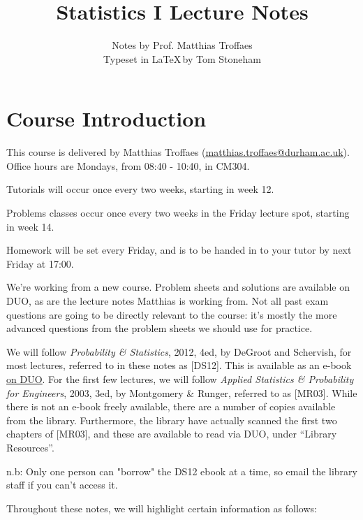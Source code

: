 \documentclass[a4paper]{article}
\title{\vspace{-2cm}Statistics I Lecture Notes}
\author{Notes by Prof. Matthias Troffaes \\ Typeset in \LaTeX \,by Tom Stoneham}
\date{}
\begin{document}
    \maketitle

    \tableofcontents

    \newpage
    \section*{Course Introduction}
        This course is delivered by Matthias Troffaes
        (\href{mailto:matthias.troffaes@durham.ac.uk}
        {\underline{matthias.troffaes@durham.ac.uk}}). Office hours are Mondays,
        from 08:40 - 10:40, in CM304.

        Tutorials will occur once every two weeks, starting in week 12.

        Problems classes occur once every two weeks in the Friday lecture spot,
        starting in week 14.

        Homework will be set every Friday, and is to be handed in to your tutor
        by next Friday at 17:00.

        We're working from a new course. Problem sheets and solutions are
        available on DUO, as are the lecture notes Matthias is working from. Not
        all past exam questions are going to be directly relevant to the course:
        it's mostly the more advanced questions from the problem sheets we
        should use for practice.

        We will follow \textit{Probability \& Statistics}, 2012, 4ed, by DeGroot
        and Schervish, for most lectures, referred to in these notes as [DS12].
        This is available as an e-book
        \href{http://library.dur.ac.uk/record=b2868012~S1}{\underline{on DUO}}.
        For the first few lectures, we will follow \textit{Applied Statistics \&
        Probability for Engineers}, 2003, 3ed, by Montgomery \& Runger, referred
        to as [MR03]. While there is not an e-book freely available, there are a
        number of copies available from the library. Furthermore, the library
        have actually scanned the first two chapters of [MR03], and these are
        available to read via DUO, under ``Library Resources''.

        n.b: Only one person can "borrow" the DS12 ebook at a time, so email the
        library staff if you can't access it.

        Throughout these notes, we will highlight certain information as
        follows:
\end{document}
